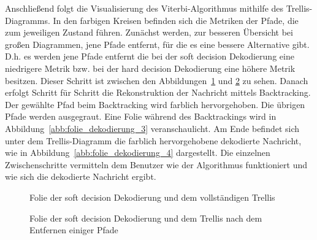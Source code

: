 Anschließend folgt die Visualisierung des Viterbi-Algorithmus mithilfe des Trellis-Diagramms. In den farbigen Kreisen befinden sich die Metriken der Pfade, die zum jeweiligen Zustand führen. Zunächst werden, zur besseren Übersicht bei großen Diagrammen, jene Pfade entfernt, für die es eine bessere Alternative gibt. D.h. es werden jene Pfade entfernt die bei der soft decision Dekodierung eine niedrigere Metrik bzw. bei der hard decision Dekodierung eine höhere Metrik besitzen. Dieser Schritt ist zwischen den Abbildungen~\ref{abb:folie_dekodierung_1} und \ref{abb:folie_dekodierung_2} zu sehen. Danach erfolgt Schritt für Schritt die Rekonstruktion der Nachricht mittels Backtracking. Der gewählte Pfad beim Backtracking wird farblich hervorgehoben. Die übrigen Pfade werden ausgegraut. Eine Folie während des Backtrackings wird in Abbildung~\ref{abb:folie_dekodierung_3} veranschaulicht. Am Ende befindet sich unter dem Trellis-Diagramm die farblich hervorgehobene dekodierte Nachricht, wie in Abbildung~\ref{abb:folie_dekodierung_4} dargestellt. Die einzelnen Zwischenschritte vermitteln dem Benutzer wie der Algorithmus funktioniert und wie sich die dekodierte Nachricht ergibt.
\begin{figure}[th]
	\centering
	\caption{Folie der soft decision Dekodierung und dem vollständigen Trellis}
	\label{abb:folie_dekodierung_1}
\end{figure}
\begin{figure}[th]
	\centering
	\caption{Folie der soft decision Dekodierung und dem Trellis nach dem Entfernen einiger Pfade}
	\label{abb:folie_dekodierung_2}
\end{figure}

